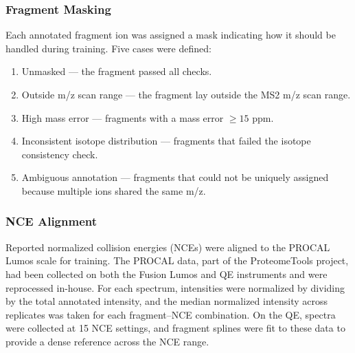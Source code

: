\documentclass[pdflatex,sn-nature]{sn-jnl}
\begin{document}
\subsubsection{Fragment Masking}\label{subsubsec:fragment-masking}
Each annotated fragment ion was assigned a mask indicating how it should be handled during training. Five cases were defined:

\begin{adjustwidth}{2em}{0pt} %
    \begin{enumerate}
      \item Unmasked --- the fragment passed all checks.
      \item Outside m/z scan range --- the fragment lay outside the MS2 m/z scan range.
      \item High mass error --- fragments with a mass error $\geq15$ ppm.
      \item Inconsistent isotope distribution --- fragments that failed the isotope consistency check.
      \item Ambiguous annotation --- fragments that could not be uniquely assigned because multiple ions shared the same m/z.
    \end{enumerate}
\end{adjustwidth}
	
\subsubsection{NCE Alignment}\label{subsubsec:nce-alignment}
Reported normalized collision energies (NCEs) were aligned to the PROCAL Lumos scale for training. The PROCAL data, part of the ProteomeTools project, had been collected on both the Fusion Lumos and QE instruments and were reprocessed in-house. For each spectrum, intensities were normalized by dividing by the total annotated intensity, and the median normalized intensity across replicates was taken for each fragment–NCE combination. On the QE, spectra were collected at 15 NCE settings, and fragment splines were fit to these data to provide a dense reference across the NCE range.
\end{document}
